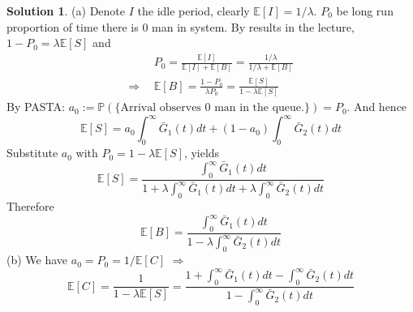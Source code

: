 \documentclass[a4paper, 10pt]{article}
\theoremstyle{definition}
\theoremstyle{hSol}
\newtheorem*{solution}{Solution}
\begin{document}
\begin{solution} (a) Denote $I$ the idle period, clearly $\mathbb{E}\left[I\right]=1/\lambda$. $P_0$ be long run proportion of time there is $0$ man in system. By results in the lecture, $1-P_0 = \lambda \mathbb{E}\left[S\right]$ and
\begin{equation}
  \begin{split}
    & P_0 = \frac{\mathbb{E}\left[I\right]}{\mathbb{E}\left[I\right]+\mathbb{E}\left[B\right]} = \frac{1/\lambda}{1/\lambda + \mathbb{E}\left[B\right]} \\
    \Rightarrow~~& \mathbb{E}\left[B\right] = \frac{1-P_0}{\lambda P_0} = \frac{\mathbb{E}\left[S\right]}{1- \lambda \mathbb{E}\left[S\right]}
  \end{split}
\end{equation}
By PASTA: $a_0:=\mathbb{P}\left(\{\text{Arrival observes 0 man in the queue.}\}\right)=P_0$. And hence
\begin{equation}
  \mathbb{E}\left[S\right] = a_0 \int_0^{\infty} \bar{G}_1(t)dt + (1-a_0)\int_0^{\infty} \bar{G}_2(t)dt
\end{equation}
Substitute $a_0$ with $P_0=1- \lambda \mathbb{E}\left[S\right]$, yields
\begin{equation}
  \mathbb{E}\left[S\right] = \frac{\int_0^{\infty} \bar{G}_1(t)dt}{1+\lambda \int_0^{\infty} \bar{G}_1(t)dt+ \lambda\int_0^{\infty} \bar{G}_2(t)dt}
\end{equation}
Therefore
\begin{equation}
  \mathbb{E}\left[B\right] = \frac{\int_0^{\infty} \bar{G}_1(t)dt}{1- \lambda\int_0^{\infty} \bar{G}_2(t)dt}
\end{equation}
(b) We have $a_0 = P_0 = 1/\mathbb{E}\left[C\right]$ $\Rightarrow$
\begin{equation}
  \mathbb{E}\left[C\right] = \frac{1}{1- \lambda \mathbb{E}\left[S\right]} = \frac{1+\int_0^{\infty} \bar{G}_1(t)dt-\int_0^{\infty} \bar{G}_2(t)dt}{1-\int_0^{\infty} \bar{G}_2(t)dt}
\end{equation}
\end{solution}
\end{document}
